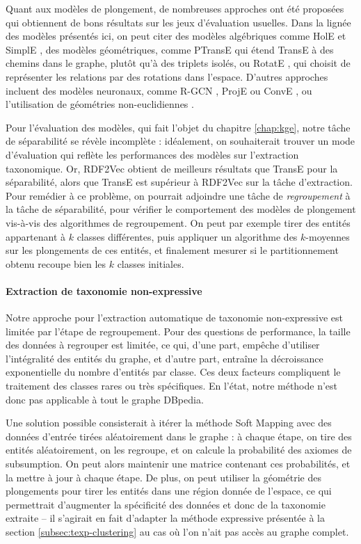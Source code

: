 Quant aux modèles de plongement, de nombreuses approches ont été proposées qui obtiennent de bons résultats sur les jeux d'évaluation usuelles. Dans la lignée des modèles présentés ici, on peut citer des modèles algébriques comme HolE \cite{hole2016} et SimplE \cite{simple2018}, des modèles géométriques, comme PTransE \cite{ptranse} qui étend TransE à des chemins dans le graphe, plutôt qu'à des triplets isolés, ou RotatE \cite{rotate2019}, qui choisit de représenter les relations par des rotations dans l'espace. D'autres approches incluent des modèles neuronaux, comme R-GCN \cite{rgcn2018}, ProjE \cite{proje2017} ou ConvE \cite{conve2018}, ou l'utilisation de géométries non-euclidiennes \cite{nickel2017poincare, nickel2018learning}.

Pour l'évaluation des modèles, qui fait l'objet du chapitre \ref{chap:kge}, notre tâche de séparabilité se révèle incomplète : idéalement, on souhaiterait trouver un mode d'évaluation qui reflète les performances des modèles sur l'extraction taxonomique. Or, RDF2Vec obtient de meilleurs résultats que TransE pour la séparabilité, alors que TransE est supérieur à RDF2Vec sur la tâche d'extraction.  
Pour remédier à ce problème, on pourrait adjoindre une tâche de \textit{regroupement} à la tâche de séparabilité, pour vérifier le comportement des modèles de plongement vis-à-vis des algorithmes de regroupement. 
On peut par exemple tirer des entités appartenant à $k$ classes différentes, puis appliquer un algorithme des $k$-moyennes sur les plongements de ces entités, et finalement mesurer si le partitionnement obtenu recoupe bien les $k$ classes initiales.

\paragraph{Extraction de taxonomie non-expressive}

Notre approche pour l'extraction automatique de taxonomie non-expressive est limitée par l'étape de regroupement. Pour des questions de performance, la taille des données à regrouper est limitée, ce qui, d'une part, empêche d'utiliser l'intégralité des entités du graphe, et d'autre part, entraîne la décroissance exponentielle du nombre d'entités par classe. Ces deux facteurs compliquent le traitement des classes rares ou très spécifiques. En l'état, notre méthode n'est donc pas applicable à tout le graphe DBpedia.

Une solution possible consisterait à itérer la méthode Soft Mapping avec des données d'entrée tirées aléatoirement dans le graphe : à chaque étape, on tire des entités aléatoirement, on les regroupe, et on calcule la probabilité des axiomes de subsumption. On peut alors maintenir une matrice contenant ces probabilités, et la mettre à jour à chaque étape. De plus, on peut utiliser la géométrie des plongements pour tirer les entités dans une région donnée de l'espace, ce qui permettrait d'augmenter la spécificité des données et donc de la taxonomie extraite – il s'agirait en fait d'adapter la méthode expressive présentée à la section \ref{subsec:texp-clustering} au cas où l'on n'ait pas accès au graphe complet.


